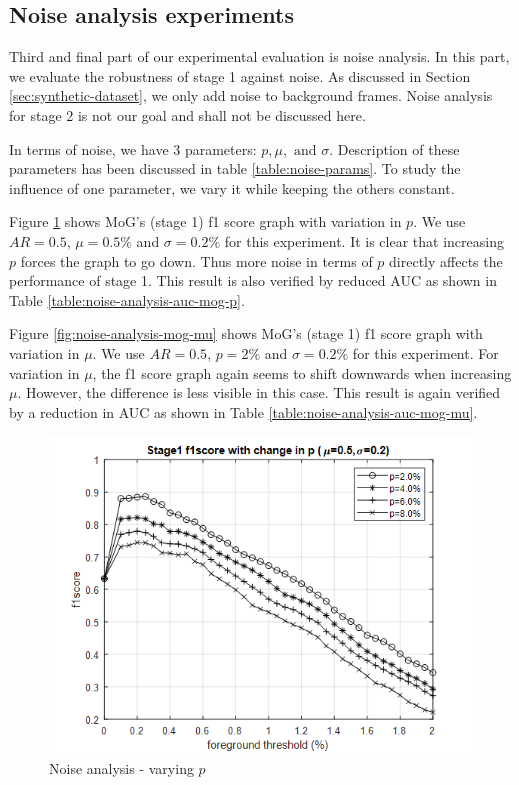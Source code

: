 \subsection{Noise analysis experiments}
Third and final part of our experimental evaluation is noise analysis. In this part, we evaluate the robustness of stage 1 against noise. As discussed in Section \ref{sec:synthetic-dataset}, we only add noise to background frames. Noise analysis for stage 2 is not our goal and shall not be discussed here. 

In terms of noise, we have 3 parameters: $p, \mu, \text{ and } \sigma$. Description of these parameters has been discussed in table \ref{table:noise-params}. To study the influence of one parameter, we vary it while keeping the others constant.   

Figure \ref{fig:noise-analysis-mog-p} shows MoG's (stage 1) f1 score graph with variation in $p$. We use $AR=0.5$, $\mu=0.5\%$ and $\sigma=0.2\%$ for this experiment. It is clear that increasing $p$ forces the graph to go down. Thus more noise in terms of $p$ directly affects the performance of stage 1. This result is also verified by reduced AUC as shown in Table \ref{table:noise-analysis-auc-mog-p}.

Figure \ref{fig:noise-analysis-mog-mu} shows MoG's (stage 1) f1 score graph with variation in $\mu$. We use $AR=0.5$, $p=2\%$ and $\sigma=0.2\%$ for this experiment. For variation in $\mu$, the f1 score graph again seems to shift downwards when increasing $\mu$. However, the difference is less visible in this case. This result is again verified by a reduction in AUC as shown in Table \ref{table:noise-analysis-auc-mog-mu}.  

\begin{figure}
    \centering
    \includegraphics[width=\linewidth]{images/noise-analysis-mog-p.png}
    \caption{Noise analysis - varying $p$}
    \label{fig:noise-analysis-mog-p}
\end{figure}

